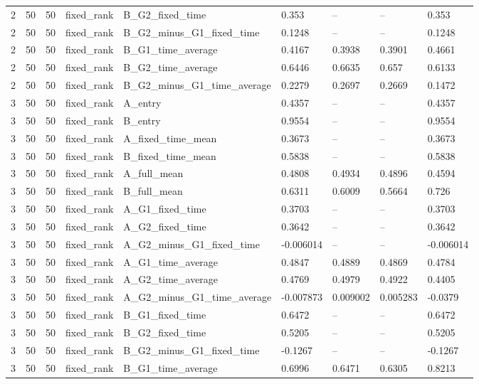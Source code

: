 \begin{longtable}{lllllllll}
2 & 50 & 50 & fixed\_rank & B\_G2\_fixed\_time & 0.353 & -- & -- & 0.353 \\
2 & 50 & 50 & fixed\_rank & B\_G2\_minus\_G1\_fixed\_time & 0.1248 & -- & -- & 0.1248 \\
2 & 50 & 50 & fixed\_rank & B\_G1\_time\_average & 0.4167 & 0.3938 & 0.3901 & 0.4661 \\
2 & 50 & 50 & fixed\_rank & B\_G2\_time\_average & 0.6446 & 0.6635 & 0.657 & 0.6133 \\
2 & 50 & 50 & fixed\_rank & B\_G2\_minus\_G1\_time\_average & 0.2279 & 0.2697 & 0.2669 & 0.1472 \\
3 & 50 & 50 & fixed\_rank & A\_entry & 0.4357 & -- & -- & 0.4357 \\
3 & 50 & 50 & fixed\_rank & B\_entry & 0.9554 & -- & -- & 0.9554 \\
3 & 50 & 50 & fixed\_rank & A\_fixed\_time\_mean & 0.3673 & -- & -- & 0.3673 \\
3 & 50 & 50 & fixed\_rank & B\_fixed\_time\_mean & 0.5838 & -- & -- & 0.5838 \\
3 & 50 & 50 & fixed\_rank & A\_full\_mean & 0.4808 & 0.4934 & 0.4896 & 0.4594 \\
3 & 50 & 50 & fixed\_rank & B\_full\_mean & 0.6311 & 0.6009 & 0.5664 & 0.726 \\
3 & 50 & 50 & fixed\_rank & A\_G1\_fixed\_time & 0.3703 & -- & -- & 0.3703 \\
3 & 50 & 50 & fixed\_rank & A\_G2\_fixed\_time & 0.3642 & -- & -- & 0.3642 \\
3 & 50 & 50 & fixed\_rank & A\_G2\_minus\_G1\_fixed\_time & -0.006014 & -- & -- & -0.006014 \\
3 & 50 & 50 & fixed\_rank & A\_G1\_time\_average & 0.4847 & 0.4889 & 0.4869 & 0.4784 \\
3 & 50 & 50 & fixed\_rank & A\_G2\_time\_average & 0.4769 & 0.4979 & 0.4922 & 0.4405 \\
3 & 50 & 50 & fixed\_rank & A\_G2\_minus\_G1\_time\_average & -0.007873 & 0.009002 & 0.005283 & -0.0379 \\
3 & 50 & 50 & fixed\_rank & B\_G1\_fixed\_time & 0.6472 & -- & -- & 0.6472 \\
3 & 50 & 50 & fixed\_rank & B\_G2\_fixed\_time & 0.5205 & -- & -- & 0.5205 \\
3 & 50 & 50 & fixed\_rank & B\_G2\_minus\_G1\_fixed\_time & -0.1267 & -- & -- & -0.1267 \\
3 & 50 & 50 & fixed\_rank & B\_G1\_time\_average & 0.6996 & 0.6471 & 0.6305 & 0.8213 \\

\end{longtable}
